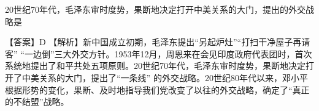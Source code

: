 \question 20世纪70年代，毛泽东审时度势，果断地决定打开中美关系的大门，提出的外交战略是
\par{}
\begin{solution}【答案】D
【解析】新中国成立初期，毛泽东提出``另起炉灶''``打扫干净屋子再请客''
``一边倒''三大外交方针。1953年12月，周恩来在会见印度政府代表团时，首次系统地提出了和平共处五项原则。20世纪70年代，毛泽东审时度势，果断地决定打开了中美关系的大门，提出了``一条线''
的外交战略。20世纪80年代以来，邓小平根据形势的变化，果断、及时地指导我们党改变了以往的外交战略，确定了``真正的不结盟''战略。
\end{solution}
